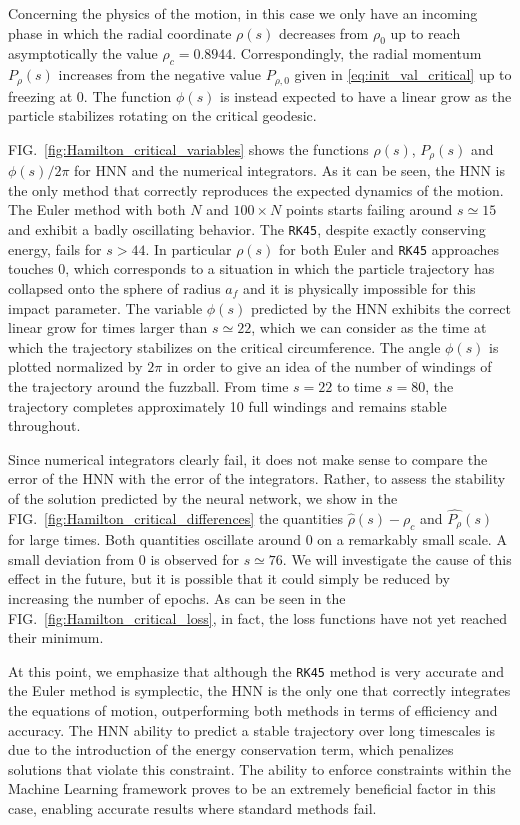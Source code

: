 \documentclass[prd,aps,a4paper,eqsecnum,nofootinbib,floatfix,twocolumn,superscriptaddress]{revtex4-2}
\begin{document}
Concerning the physics of the motion, in this case we only have an incoming phase in which the radial coordinate $\rho(s)$ decreases from $\rho_0$ up to reach asymptotically the value $\rho_c=0.8944$. 
 Correspondingly, the radial momentum $P_\rho(s)$ increases from the negative value $P_{\rho,0}$ given in \eqref{eq:init_val_critical}  up to freezing at 0. The function $\phi(s)$ is instead expected to have a linear grow as the particle stabilizes rotating on the critical geodesic.

FIG.~\ref{fig:Hamilton_critical_variables} shows the functions $\rho(s)$, $P_\rho(s)$ and $\phi(s)/2\pi$ for HNN and the numerical integrators. As it can be seen, the HNN is the only method that correctly reproduces the expected dynamics of the motion. The Euler method with both $N$ and $100\times N$ points starts failing around $s\simeq 15$ and exhibit a badly oscillating behavior. The  \texttt{RK45},  despite exactly conserving energy, fails for $s>44$. In particular $\rho(s)$ for both Euler and \texttt{RK45} approaches touches 0, which corresponds to a situation in which the particle trajectory has collapsed onto the sphere of radius $a_f$ and it is physically impossible for this impact parameter. The variable $\phi(s)$ predicted by the HNN exhibits the correct linear grow for times larger  than $s\simeq 22$, which we can consider as the time at which the trajectory stabilizes on the critical circumference. The angle $\phi(s)$ is plotted normalized by $2\pi$ in order to give an idea of the number of windings of the trajectory around the fuzzball. From time $s = 22$ to time $s = 80$, the trajectory completes approximately 10 full windings and remains stable throughout.

Since numerical integrators clearly fail, it does not make sense to compare the error of the HNN with the error of the integrators. Rather, to assess the stability of the solution predicted by the neural network, we show in the FIG.~\ref{fig:Hamilton_critical_differences} the quantities  $\widehat{\rho}(s)-\rho_c$ and $\widehat{P_\rho}(s)$ for large times. Both quantities oscillate around 0 on a remarkably small scale. A small deviation from 0 is observed for $s\simeq 76$. We will investigate the cause of this effect in the future, but it is possible that it could simply be reduced by increasing the number of epochs. As can be seen in the FIG.~\ref{fig:Hamilton_critical_loss}, in fact, the loss functions have not yet reached their minimum.

At this point, we emphasize that although the \texttt{RK45} method is very accurate and the Euler method is symplectic, the HNN is the only one that correctly integrates the equations of motion, outperforming both methods in terms of efficiency and accuracy. The HNN ability to predict a stable trajectory over long timescales is due to the introduction of the energy conservation term, which penalizes solutions that violate this constraint. The ability to enforce constraints within the Machine Learning framework proves to be an extremely beneficial factor in this case, enabling accurate results where standard methods fail.
\end{document}
